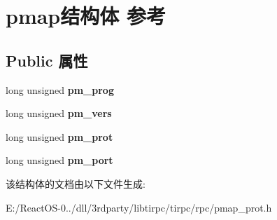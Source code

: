 \hypertarget{structpmap}{}\section{pmap结构体 参考}
\label{structpmap}
\subsection*{Public 属性}
\begin{DoxyCompactItemize}
\item 
\mbox{\label{structpmap_a6dc21d0872f514352f3f5e4b1e03f691}} 
long unsigned {\bfseries pm\+\_\+prog}
\item 
\mbox{\label{structpmap_a7c74fa3a9cb9ef0f8663613ec4fd3db5}} 
long unsigned {\bfseries pm\+\_\+vers}
\item 
\mbox{\label{structpmap_af9d9314e85537e00aa17a36d1f64ee44}} 
long unsigned {\bfseries pm\+\_\+prot}
\item 
\mbox{\label{structpmap_ac44a9d41d7ed7ee9ef9c4e3cac703730}} 
long unsigned {\bfseries pm\+\_\+port}
\end{DoxyCompactItemize}


该结构体的文档由以下文件生成\+:\begin{DoxyCompactItemize}
\item 
E\+:/\+React\+O\+S-\/0../dll/3rdparty/libtirpc/tirpc/rpc/pmap\+\_\+prot.\+h\end{DoxyCompactItemize}
